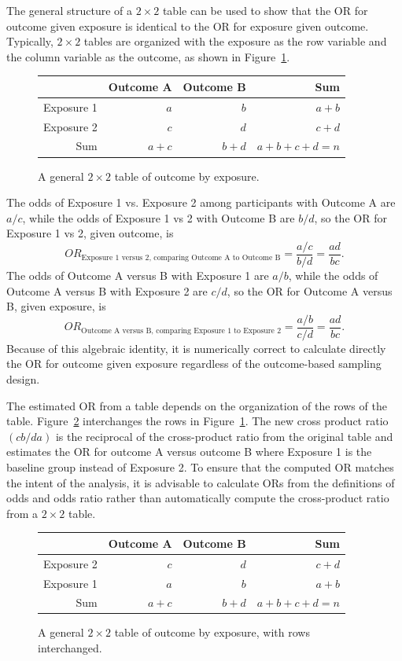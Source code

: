 The general structure of a $2 \times 2$ table can be used to show that the OR for outcome given exposure is identical to the OR for exposure given outcome.  Typically, $2 \times 2$ tables are organized with the exposure as the row variable and the column variable as the outcome, as shown in Figure~\ref{figure:generalTwoByTwoTable}.
\begin{figure}[h!]
	\centering
	\begin{tabular}{r|rrr}
		\hline
		& Outcome A & Outcome B & Sum\\
		\hline
		Exposure 1 & $a$ & $b$ & $a + b$ \\
		Exposure 2 & $c$ & $d$ & $c + d$ \\
		Sum & $a + c$ & $b + d$ & $a + b + c + d = n$ \\
		\hline
	\end{tabular}
  \caption{A general $2 \times 2$ table of outcome by exposure.}
  \label{figure:generalTwoByTwoTable}
  \end{figure}

The odds of Exposure 1 vs. Exposure 2 among participants with Outcome A are $a/c$, while the odds of Exposure 1 vs 2 with Outcome B are $b/d$, so the OR for Exposure 1 vs 2, given outcome, is
\[OR_{\text{Exposure 1 versus 2, comparing Outcome A to Outcome B}} = \dfrac{a/c}{b/d} = \dfrac{ad}{bc}. \]
The odds of Outcome A versus B with Exposure 1 are $a/b$, while the odds of Outcome A versus B with Exposure 2 are $c/d$, so the OR for Outcome A versus B, given exposure, is
\[OR_{\text{Outcome A versus B, comparing Exposure 1 to Exposure 2}} = \dfrac{a/b}{c/d} = \dfrac{ad}{bc}.
\]
Because of this algebraic identity, it is numerically correct to calculate directly the OR for outcome given exposure regardless of the outcome-based sampling design.

The estimated OR from a table depends on the organization of the rows of the table.
Figure~\ref{figure:generalTwoByTwoTableReversed} interchanges the rows in Figure~\ref{figure:generalTwoByTwoTable}.  The new cross product ratio $(cb/da)$ is the reciprocal of the cross-product ratio from the original table and estimates the OR for outcome A versus outcome B where Exposure 1 is the baseline group instead of Exposure 2. To ensure that the computed OR matches the intent of the analysis, it is advisable to calculate ORs from the definitions of odds and odds ratio rather than automatically compute the cross-product ratio from a $2 \times 2$ table.


\begin{figure}[h!]
	\centering
	\begin{tabular}{r|rrr}
		\hline
		& Outcome A & Outcome B & Sum\\
		\hline
		Exposure 2 & $c$ & $d$ & $c + d$ \\
		Exposure 1 & $a$ & $b$ & $a + b$ \\
		Sum & $a + c$ & $b + d$ & $a + b + c + d = n$ \\
		\hline
	\end{tabular}
  \caption{A general $2 \times 2$ table of outcome by exposure, with rows interchanged.}
  \label{figure:generalTwoByTwoTableReversed}
  \end{figure}


